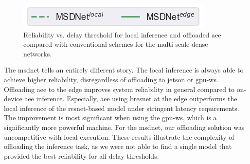 \begin{figure}
	\captionsetup[subfigure]{justification=centering, farskip=0pt,captionskip=0pt}
	\centering
	\includegraphics[width=.3\linewidth]{figures/edge/gpu_msdnet_offloading_vs_local_legend}
	\hfill
	\hfill
	\caption[Offloading comparison of multi-scale dense networks]{Reliability vs. delay threshold for local inference and offloaded \gls{aee} compared with conventional schemes for the multi-scale dense networks.}
	\label{fig:msdnet-offloading-vs-local}
\end{figure}

The \gls{msdnet} tells an entirely different story. The local inference is always able to achieve higher reliability, disregardless of offloading to \gls{jetson} or \gls{gpu-ws}. 
Offloading \gls{aee} to the edge improves system reliability in general compared to on-device \gls{aee} inference. Especially, \gls{aee} using \gls{bresnet} at the edge outperforms the local inference of the \gls{resnet}-based model under stringent latency requirements. The improvement is most significant when using the \gls{gpu-ws}, which is a significantly more powerful machine. For the \gls{msdnet}, our offloading solution was uncompetitive with local execution. These results illustrate the complexity of offloading the inference task, as we were not able to find a single model that provided the best reliability for all delay thresholds.

